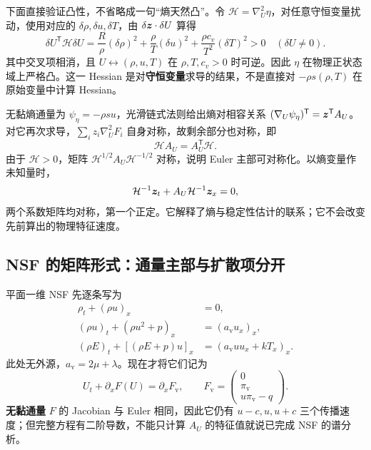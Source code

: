 下面直接验证凸性，不省略成一句“熵天然凸”。令 $\mathcal H=\nabla_U^2\eta$，对任意守恒变量扰动，使用对应的 $\delta\rho,\delta u,\delta T$，由 $\delta\bm{z}\cdot\delta U$ 算得
\begin{equation}
 \boxed{\delta U^{\mathsf T}\mathcal H\delta U
 =\frac R\rho(\delta\rho)^2+\frac\rho T(\delta u)^2
 +\frac{\rho c_v}{T^2}(\delta T)^2>0\quad(\delta U\ne0).}
 \label{eq:entropy-hessian-positive}
\end{equation}
其中交叉项相消，且 $U\leftrightarrow(\rho,u,T)$ 在 $\rho,T,c_v>0$ 时可逆。因此 $\eta$ 在物理正状态域上严格凸。这一 Hessian 是对\textbf{守恒变量}求导的结果，不是直接对 $-\rho s(\rho,T)$ 在原始变量中计算 Hessian。

无黏熵通量为 $\psi_\eta=-\rho su$，光滑链式法则给出熵对相容关系 $(\nabla_U\psi_\eta)^{\mathsf T}=\bm{z}^{\mathsf T}A_U$。对它再次求导，$\sum_i z_i\nabla_U^2F_i$ 自身对称，故剩余部分也对称，即
\begin{equation}
 \mathcal H A_U=A_U^{\mathsf T}\mathcal H.
\end{equation}
由于 $\mathcal H>0$，矩阵 $\mathcal H^{1/2}A_U\mathcal H^{-1/2}$ 对称，说明 Euler 主部可对称化。以熵变量作未知量时，
\begin{equation}
 \mathcal H^{-1}\bm{z}_t+A_U\mathcal H^{-1}\bm{z}_x=0,
\end{equation}
两个系数矩阵均对称，第一个正定。它解释了熵与稳定性估计的联系；它不会改变先前算出的物理特征速度。

\subsection{NSF 的矩阵形式：通量主部与扩散项分开}

平面一维 NSF 先逐条写为
\begin{align}
 \rho_t+(\rho u)_x&=0,\\
 (\rho u)_t+(\rho u^2+p)_x&=(a_{\mathrm v}u_x)_x,\\
 (\rho E)_t+[(\rho E+p)u]_x
 &=(a_{\mathrm v}u u_x+kT_x)_x.
\end{align}
此处无外源，$a_{\mathrm v}=2\mu+\lambda$。现在才将它们记为
\begin{equation}
 U_t+\partial_xF(U)=\partial_xF_{\mathrm v},\qquad
 F_{\mathrm v}=\begin{pmatrix}0\\\pi_{\mathrm v}\\u\pi_{\mathrm v}-q\end{pmatrix}.
\end{equation}
\textbf{无黏通量} $F$ 的 Jacobian 与 Euler 相同，因此它仍有 $u-c,u,u+c$ 三个传播速度；但完整方程有二阶导数，不能只计算 $A_U$ 的特征值就说已完成 NSF 的谱分析。

